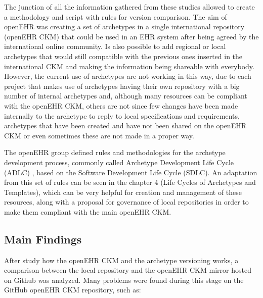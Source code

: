 \documentclass[mim_thesis.tex]{subfiles}
\begin{document}
The junction of all the information gathered from these studies allowed to create a methodology and script with rules for version comparison. The aim of openEHR was creating a set of archetypes in a single international repository (openEHR CKM) that could be used in an EHR system after being agreed by the international online community. Is also possible to add regional or local archetypes that would still compatible with the previous ones inserted in the international CKM and making the information being shareable with everybody. However, the current use of archetypes are not working in this way, due to each project that makes use of archetypes having their own repository with a big number of internal archetypes and, although many resources can be compliant with the openEHR CKM, others are not since few changes have been made internally to the archetype to reply to local specifications and requirements, archetypes that have been created and have not been shared on the openEHR CKM or even sometimes these are not made in a proper way. 

The openEHR group defined rules and methodologies for the archetype development process, commonly called Archetype Development Life Cycle (ADLC) \citep{Madsen2010}, based on the Software Development Life Cycle (SDLC). An adaptation from this set of rules can be seen in the chapter 4 (Life Cycles of Archetypes and Templates), which can be very helpful for creation and management of these resources, along with a proposal for governance of local repositories in order to make them compliant with the main openEHR CKM.



\subsection{Main Findings}
After study how the openEHR CKM and the archetype versioning works, a comparison between the local repository and the openEHR CKM mirror hosted on Github was analyzed. Many problems were found during this stage on the GitHub openEHR CKM repository, such as:
\end{document}
